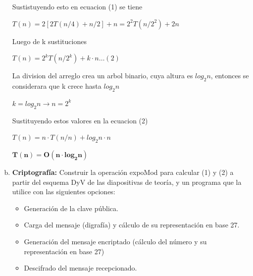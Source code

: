 \begin{enumerate}[a)]
Sustistuyendo esto en ecuacion (1) se tiene

$T(n) = 2[2T(n/4) + n/2]+n= 2^2 T(n/2^2)+2n$


Luego de k sustituciones

$T(n) = 2^k T(n/2^k)+k\cdot n \ldots (2)$

La division del arreglo crea un arbol binario, cuya altura es $log_2n$, entonces se considerara que k crece hasta $log_2n$

$k = log_2n \rightarrow n=2^k$

Sustituyendo estos valores en la ecuacion (2)

$T(n) = n\cdot T(n/n)+log_2n\cdot n$

$\mathbf{T(n) = O(n\cdot log_2n)}$

  \item \textbf{Criptografía: }Construir la operación expoMod para calcular (1) y (2) a partir del esquema DyV de las diapositivas de teoría, y un programa que la utilice con las siguientes opciones:
  \begin{itemize}
    \item Generación de la clave pública.
    \item Carga del mensaje (digrafía) y cálculo de su representación en base 27.
    \item Generación del mensaje encriptado (cálculo del número y su representación en base 27)
    \item Descifrado del mensaje recepcionado.
  \end{itemize}
\end{enumerate}


